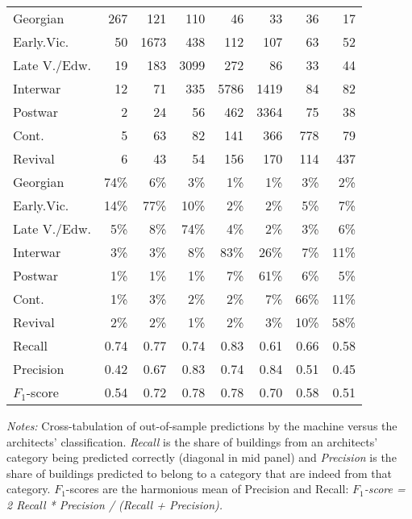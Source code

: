 \begin{table}[!htb]
\begin{tabular}{lrrrrrrr}
	Georgian & 267 & 121 & 110 & 46 & 33 & 36 & 17 \\
	  Early.Vic. & 50 & 1673 & 438 & 112 & 107 & 63 & 52 \\
	  Late V./Edw. & 19 & 183 & 3099 & 272 & 86 & 33 & 44 \\
	  Interwar & 12 & 71 & 335 & 5786 & 1419 & 84 & 82 \\
	  Postwar & 2 & 24 & 56 & 462 & 3364 & 75 & 38 \\
	  Cont. & 5 & 63 & 82 & 141 & 366 & 778 & 79 \\
	  Revival & 6 & 43 & 54 & 156 & 170 & 114 & 437 \\
	\cmidrule(lr){1-1}
\cmidrule(lr){2-8}
	  Georgian & 74\% & 6\% & 3\% & 1\% & 1\% & 3\% & 2\% \\
	  Early.Vic. & 14\% & 77\% & 10\% & 2\% & 2\% & 5\% & 7\% \\
	  Late V./Edw. & 5\% & 8\% & 74\% & 4\% & 2\% & 3\% & 6\% \\
	  Interwar & 3\% & 3\% & 8\% & 83\% & 26\% & 7\% & 11\% \\
	  Postwar & 1\% & 1\% & 1\% & 7\% & 61\% & 6\% & 5\% \\
	  Cont. & 1\% & 3\% & 2\% & 2\% & 7\% & 66\% & 11\% \\
	  Revival & 2\% & 2\% & 1\% & 2\% & 3\% & 10\% & 58\% \\
		\cmidrule(lr){1-1}
\cmidrule(lr){2-8}
	  Recall & 0.74 & 0.77 & 0.74 & 0.83 & 0.61 & 0.66 & 0.58 \\
	  Precision & 0.42 & 0.67 & 0.83 & 0.74 & 0.84 & 0.51 & 0.45 \\
	  $F_1$-score & 0.54 & 0.72 & 0.78 & 0.78 & 0.70 & 0.58 & 0.51 \\
	 \bottomrule
\end{tabular}

\begin{minipage}{\textwidth}
\footnotesize
\vspace{0.25cm}
	\emph{Notes:} Cross-tabulation of out-of-sample predictions by the machine versus the architects' classification.
	\emph{Recall} is the share of buildings from an architects' category being predicted correctly (diagonal in mid panel) and \emph{Precision} is the share of buildings predicted to belong to a category that are indeed from that category.
	$F_1$-scores are the harmonious mean of Precision and Recall: \emph{ $F_1$-score = 2 Recall * Precision / (Recall + Precision).}
\end{minipage}


\endgroup
\end{table}
